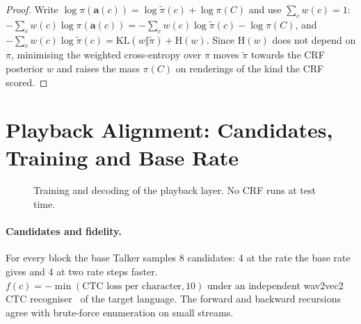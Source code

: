 \begin{proof}
Write $\log\pi(\bm{a}(c))=\log\tilde{\pi}(c)+\log\pi(C)$ and use $\sum_cw(c)=1$:
$-\sum_cw(c)\log\pi(\bm{a}(c))=-\sum_cw(c)\log\tilde{\pi}(c)-\log\pi(C)$, and
$-\sum_cw(c)\log\tilde{\pi}(c)=\mathrm{KL}(w\Vert\tilde{\pi})+\mathrm{H}(w)$.
Since $\mathrm{H}(w)$ does not depend on $\pi$, minimising the weighted cross-entropy over $\pi$ moves $\tilde{\pi}$
towards the CRF posterior $w$ and raises the mass $\pi(C)$ on renderings of the kind the CRF scored.
\end{proof}

\section{Playback Alignment: Candidates, Training and Base Rate}
\label{app:plem}

\begin{figure}[h]
\small
{}
\caption{Training and decoding of the playback layer. No CRF runs at test time.}
\label{alg:pa}
\end{figure}

\paragraph{Candidates and fidelity.} For every block the base Talker samples 8 candidates: 4 at the rate the
base rate gives and 4 at two rate steps faster. $f(c)=-\min(\text{CTC loss per character},10)$ under an
independent wav2vec2 CTC recogniser~\citep{baevski2020wav2vec} of the target language. The forward and backward
recursions agree with brute-force enumeration on small streams.

